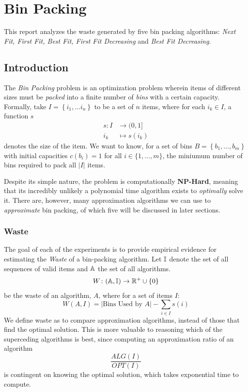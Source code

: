 \section{Bin Packing}
\noindent This report analyzes the waste generated by five bin packing
algorithms: \emph{Next Fit, First Fit, Best Fit, First Fit Decreasing}
and \emph{Best Fit Decreasing}.


\subsection{Introduction}
The \emph{Bin Packing} problem is an optimization problem wherein items of
different sizes must be \emph{packed} into a finite number of \emph{bins} with
a certain capacity. Formally, take $I = \left\{i_1, \dots i_n \right\}$ to be
a set of $n$ items, where for each $i_k \in I$, a function $s$
\begin{align*}
	s \colon  I & \to (0, 1]     \\
	i_k         & \mapsto s(i_k)
\end{align*}
denotes the size of the item. We want to know, for a set of bins
$B = \left\{ b_1, \dots, b_m \right\}$ with initial capacities $c(b_i) = 1$ for
all $i \in \{1, \dots, m\}$, the miniumum number of bins required to pack all
$|I|$ items.

Despite its simple nature, the problem is computationally
\textbf{NP-Hard}, meaning that its incredibly unlikely a polynomial time
algorithm exists to \emph{optimally} solve it. There are, however, many
approximation algorithms we can use to \emph{approximate} bin packing, of which
five will be discussed in later sections.

\subsubsection{Waste}
The goal of each of the experiments is to provide empirical evidence for
estimating the \emph{Waste} of a bin-packing algorithm. Let $\mathbb{I}$ denote the
set of all sequences of valid items and $\mathbb{A}$ the set of all algorithms.
\begin{equation*}
	W \colon (\mathbb{A}, \mathbb{I}) \to \mathbb{R}^+ \cup \left\{ 0 \right\}
\end{equation*}
be the waste of an algorithm, $A$,  where for a set of items $I$:
\begin{equation*}
	W(A, I) = |\text{Bins Used by }A| - \sum_{i \in I} s(i)
\end{equation*}
We define waste as to compare approximation algorithms, instead of those that
find the optimal solution. This is more valuable to reasoning which of the
superceding algorithms is best, since computing an approximation ratio
of an algorithm
\begin{equation*}
	\frac{ALG(I)}{OPT(I)}
\end{equation*}
is contingent on knowing the optimal solution, which takes exponential time
to compute.

